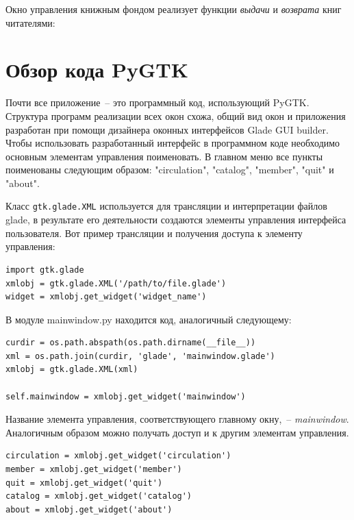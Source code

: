 \documentclass[a4paper,openany,twoside,final]{book}
\providecommand*{\DUroletitlereference}[1]{\textsl{#1}}
\begin{document}
Окно управления книжным фондом реализует функции \emph{выдачи} и \emph{возврата} книг читателями:

\noindent{}


\section{Обзор кода PyGTK%
  \label{pygtk}%
}

Почти все приложение~-- это программный код, использующий PyGTK. Структура программ реализации всех окон схожа, общий вид окон и приложения разработан при помощи дизайнера оконных интерфейсов Glade GUI builder.  Чтобы использовать разработанный интерфейс в программном коде необходимо основным элементам управления поименовать.  В главном меню все пункты поименованы следующим образом: "circulation", "catalog", "member", "quit" и "about".

Класс \texttt{gtk.glade.XML} используется для трансляции и интерпретации файлов glade, в результате его деятельности создаются элементы управления интерфейса пользователя.  Вот пример трансляции и получения доступа к элементу управления:

\begin{verbatim}
import gtk.glade
xmlobj = gtk.glade.XML('/path/to/file.glade')
widget = xmlobj.get_widget('widget_name')
\end{verbatim}

В модуле mainwindow.py находится код, аналогичный следующему:

\begin{verbatim}
curdir = os.path.abspath(os.path.dirname(__file__))
xml = os.path.join(curdir, 'glade', 'mainwindow.glade')
xmlobj = gtk.glade.XML(xml)

self.mainwindow = xmlobj.get_widget('mainwindow')
\end{verbatim}

Название элемента управления, соответствующего главному окну,~-- \DUroletitlereference{mainwindow}.  Аналогичным образом можно получать доступ и к другим элементам управления.

\begin{verbatim}
circulation = xmlobj.get_widget('circulation')
member = xmlobj.get_widget('member')
quit = xmlobj.get_widget('quit')
catalog = xmlobj.get_widget('catalog')
about = xmlobj.get_widget('about')
\end{verbatim}
\end{document}
